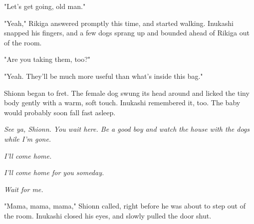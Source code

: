 "Let's get going, old man."

"Yeah," Rikiga answered promptly this time, and started walking.
Inukashi snapped his fingers, and a few dogs sprang up and bounded ahead
of Rikiga out of the room.

"Are you taking them, too?"

"Yeah. They'll be much more useful than what's inside this bag."

Shionn began to fret. The female dog swung its head around and licked
the tiny body gently with a warm, soft touch. Inukashi remembered it,
too. The baby would probably soon fall fast asleep.

\emph{See ya, Shionn. You wait here. Be a good boy and watch the house with
the dogs while I'm gone.}

\emph{I'll come home.}

\emph{I'll come home for you someday.}

\emph{Wait for me.}

"Mama, mama, mama," Shionn called, right before he was about to step out
of the room. Inukashi closed his eyes, and slowly pulled the door shut.